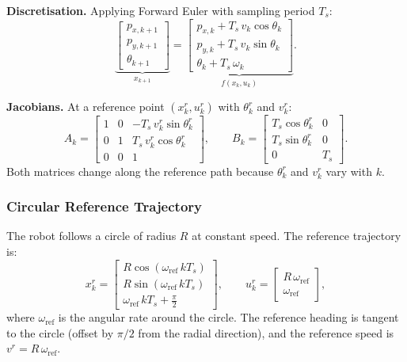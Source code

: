 \textbf{Discretisation.} Applying Forward Euler with sampling period $T_s$:
\begin{equation*}
	\underbrace{\begin{bmatrix} p_{x,k+1} \\ p_{y,k+1} \\ \theta_{k+1} \end{bmatrix}}_{x_{k+1}}
	= \underbrace{\begin{bmatrix} p_{x,k} + T_s\, v_k \cos\theta_k \\ p_{y,k} + T_s\, v_k \sin\theta_k \\ \theta_k + T_s\, \omega_k \end{bmatrix}}_{f(x_k, u_k)}.
\end{equation*}

\textbf{Jacobians.} At a reference point $(x^r_k, u^r_k)$ with $\theta^r_k$ and $v^r_k$:
\[
A_k = \begin{bmatrix} 1 & 0 & -T_s\, v^r_k \sin\theta^r_k \\ 0 & 1 & T_s\, v^r_k \cos\theta^r_k \\ 0 & 0 & 1 \end{bmatrix}, \qquad
B_k = \begin{bmatrix} T_s \cos\theta^r_k & 0 \\ T_s \sin\theta^r_k & 0 \\ 0 & T_s \end{bmatrix}.
\]
Both matrices change along the reference path because $\theta^r_k$ and $v^r_k$ vary with $k$.

\subsubsection*{Circular Reference Trajectory}

The robot follows a circle of radius $R$ at constant speed. The reference trajectory is:
\[
x^r_k = \begin{bmatrix} R\cos(\omega_{\text{ref}}\, k T_s) \\ R\sin(\omega_{\text{ref}}\, k T_s) \\ \omega_{\text{ref}}\, k T_s + \tfrac{\pi}{2} \end{bmatrix}, \qquad
u^r_k = \begin{bmatrix} R\,\omega_{\text{ref}} \\ \omega_{\text{ref}} \end{bmatrix},
\]
where $\omega_{\text{ref}}$ is the angular rate around the circle. The reference heading is tangent to the circle (offset by $\pi/2$ from the radial direction), and the reference speed is $v^r = R\,\omega_{\text{ref}}$.

